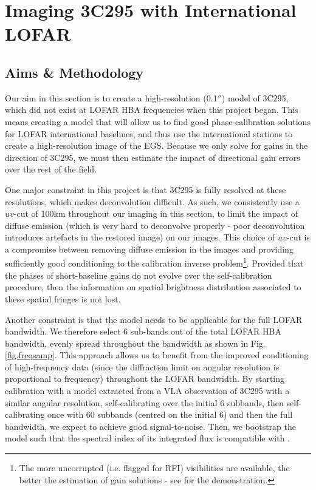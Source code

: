 \chapter{Imaging 3C295 with International LOFAR}\label{section.3c295}
\minitoc
\section{Aims \& Methodology}
\pg
Our aim in this section is to create a high-resolution (0.1$''$) model of 3C295, which did not exist at LOFAR HBA frequencies when this project began. This means creating a model that will allow us to find good phase-calibration solutions for LOFAR international baselines, and thus use the international stations to create a high-resolution image of the EGS. Because we only solve for gains in the direction of 3C295, we must then estimate the impact of directional gain errors over the rest of the field.

\pg
One major constraint in this project is that 3C295 is fully resolved at these resolutions, which makes deconvolution difficult. As such, we consistently use a $uv$-cut of $100$km throughout our imaging in this section, to limit the impact of diffuse emission (which is very hard to deconvolve properly - poor deconvolution introduces artefacts in the restored image) on our images. This choice of $uv$-cut is a compromise between removing diffuse emission in the images and providing sufficiently good conditioning to the calibration inverse problem\footnote{The more uncorrupted (i.e. flagged for RFI) visibilities are available, the better the estimation of gain solutions - see  for the demonstration.}. Provided that the phases of short-baseline gains do not evolve over the self-calibration procedure, then the information on spatial brightness distribution associated to these spatial fringes is not lost. 

\pg
Another constraint is that the model needs to be applicable for the full LOFAR bandwidth. We therefore select 6 sub-bands out of the total LOFAR HBA bandwidth, evenly spread throughout the bandwidth as shown in Fig. \ref{fig.freqsamp}. This approach allows us to benefit from the improved conditioning of high-frequency data (since the diffraction limit on angular resolution is proportional to frequency) throughout the LOFAR bandwidth. By starting calibration with a model extracted from a VLA observation of 3C295 with a similar angular resolution, self-calibrating over the initial 6 subbands, then self-calibrating once with 60 subbands (centred on the initial 6) and then the full bandwidth, we expect to achieve good signal-to-noise. Then, we bootstrap the model such that the spectral index of its integrated flux is compatible with .


